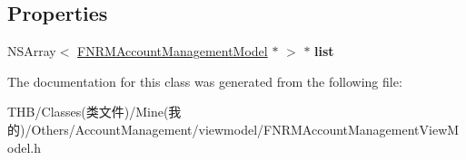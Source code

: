 \subsection*{Properties}
\begin{DoxyCompactItemize}
\item 
\mbox{\label{interface_f_n_r_m_account_management_view_model_aa2098824c86d6271a94a388ba1b9a7c4}} 
N\+S\+Array$<$ \mbox{\hyperlink{interface_f_n_r_m_account_management_model}{F\+N\+R\+M\+Account\+Management\+Model}} $\ast$ $>$ $\ast$ {\bfseries list}
\end{DoxyCompactItemize}


The documentation for this class was generated from the following file\+:\begin{DoxyCompactItemize}
\item 
T\+H\+B/\+Classes(类文件)/\+Mine(我的)/\+Others/\+Account\+Management/viewmodel/F\+N\+R\+M\+Account\+Management\+View\+Model.\+h\end{DoxyCompactItemize}
